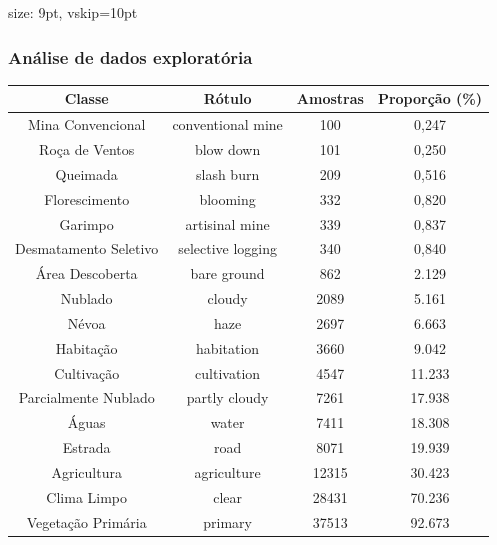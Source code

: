 \documentclass{beamer}
\begin{document}
\begin{frame}{size: 9pt, vskip=10pt}
    \frametitle{Análise de dados exploratória}
    \fontsize{9pt}{10pt}\selectfont
    \begin{tabular}{*{4}{c}}
        \hline
        Classe                  &            Rótulo &  Amostras      &  Proporção (\%) \\
        \hline
        Mina Convencional       & conventional mine &        100     &       0,247 \\
        Roça de Ventos          &         blow down &        101     &       0,250 \\
        Queimada                &        slash burn &        209     &       0,516 \\
        Florescimento           &          blooming &        332     &       0,820 \\
        Garimpo                 &    artisinal mine &        339     &       0,837 \\
        Desmatamento Seletivo   & selective logging &        340     &       0,840 \\
        Área Descoberta         &       bare ground &        862     &       2.129 \\
        Nublado                 &            cloudy &       2089     &       5.161 \\
        Névoa                   &              haze &       2697     &       6.663 \\
        Habitação               &        habitation &       3660     &       9.042 \\
        Cultivação              &       cultivation &       4547     &      11.233 \\
        Parcialmente Nublado    &     partly cloudy &       7261     &      17.938 \\
        Águas                   &             water &       7411     &      18.308 \\
        Estrada                 &              road &       8071     &      19.939 \\
        Agricultura             &       agriculture &      12315     &      30.423 \\
        Clima Limpo             &             clear &      28431     &      70.236 \\
        Vegetação Primária      &           primary &      37513     &      92.673 \\
        \hline
    \end{tabular}
  
\end{frame}
\end{document}
